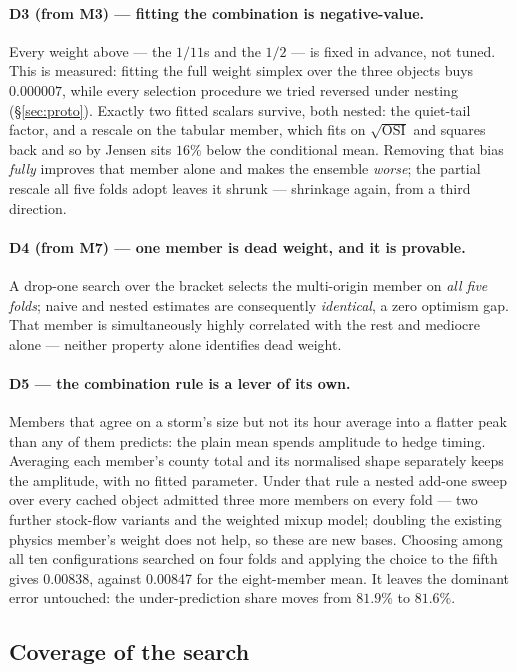 \documentclass[10pt,letterpaper,twocolumn]{article}
\begin{document}
\paragraph{D3 (from M3) --- fitting the combination is negative-value.} Every
weight above --- the $1/11$s and the $1/2$ --- is fixed in advance, not tuned. This is measured: fitting the full weight simplex over the three objects buys
$0.000007$, while every selection procedure we tried reversed under nesting
(§\ref{sec:proto}). Exactly two fitted scalars survive, both nested: the
quiet-tail factor, and a rescale on the tabular member, which fits on
$\sqrt{\mathrm{OSI}}$ and squares back and so by Jensen sits $16\%$ below the
conditional mean. Removing that bias \emph{fully} improves that member alone
and makes the ensemble \emph{worse}; the partial rescale all five folds adopt
leaves it shrunk --- shrinkage again, from a third direction.

\paragraph{D4 (from M7) --- one member is dead weight, and it is provable.} A drop-one search over the bracket selects the multi-origin
member on \emph{all five folds}; naive and nested estimates are consequently
\emph{identical}, a zero optimism gap. That member is
simultaneously highly correlated with the rest and mediocre alone --- neither
property alone identifies dead weight.


\paragraph{D5 --- the combination rule is a lever of its own.} Members that
agree on a storm's size but not its hour average into a flatter peak than any
of them predicts: the plain mean spends amplitude to hedge timing. Averaging
each member's county total and its normalised shape separately keeps the
amplitude, with no fitted parameter. Under that rule a nested add-one sweep
over every cached object admitted three more members on every fold --- two
further stock-flow variants and the weighted mixup model; doubling the
existing physics member's weight does not help, so these are new bases. Choosing among all ten
configurations searched on four folds and applying the choice to the fifth
gives 0.00838, against 0.00847 for the eight-member mean. It leaves the
dominant error untouched: the under-prediction share moves from $81.9\%$ to
$81.6\%$.

\subsection{Coverage of the search}
\end{document}
